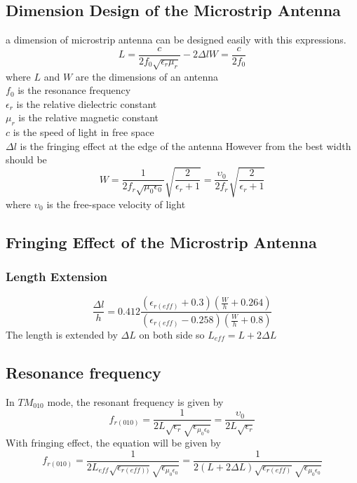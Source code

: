   \subsection{Dimension Design of the Microstrip Antenna}
    \indent a dimension of microstrip antenna can be designed easily with this expressions\cite{NoK:05}.
    \begin{equation}
      L = \frac{c}{2f_0\sqrt{\epsilon_r\mu_r}} - 2\Delta l 
      W = \frac{c}{2f_0}
    \end{equation}
    \indent where $L$ and $W$ are the dimensions of an antenna\\[1ex]
    \indent $f_0$ is the resonance frequency\\[1ex]
    \indent $\epsilon_r$ is the relative dielectric constant\\[1ex]
    \indent $\mu_r$ is the relative magnetic constant\\[1ex]
    \indent $c$ is the speed of light in free space\\[1ex]
    \indent $\Delta l$ is the fringing effect at the edge of the antenna
    \indent However from \cite{CoB:05} the best width should be
    \begin{equation}
      W = \frac {1} {2 f_r \sqrt{\mu_{0} \epsilon_{0}}}\sqrt{\frac{2}{\epsilon_{r} + 1}} = \frac{\upsilon_{0}}{2f_{r}}\sqrt{\frac{2}{\epsilon_{r} + 1}}
    \end{equation}
    \indent where $\upsilon_{0}$ is the free-space velocity of light

  \subsection{Fringing Effect of the Microstrip Antenna}
    \subsubsection {Length Extension} 
    \begin{equation}
      \frac{\Delta l}{h}=0.412\frac{(\epsilon_{r(eff)}+0.3)(\frac{W}{h} + 0.264)}{(\epsilon_{r(eff)}-0.258)(\frac{W}{h} + 0.8)}
    \end{equation}
    \indent The length is extended by $\Delta L$ on both side so $L_{eff} = L + 2\Delta L$\\

  \subsection{Resonance frequency}
    \indent In $TM_{010}$ mode, the resonant frequency is given by
    \begin{equation}  
      f_{r(010)} =  \frac{1}{2 L\sqrt{\epsilon_{r}}\sqrt{\epsilon_{\mu_{0}\epsilon_{0}}}}= \frac{\upsilon_{0}}{2L\sqrt{\epsilon_{r}}}
    \end{equation}
    \indent With fringing effect, the equation will be given by
    \begin{equation} 
      f_{r(010)} =  \frac{1}{2 L_{eff}\sqrt{\epsilon_{r(eff))}}\sqrt{\epsilon_{\mu_{0}\epsilon_{0}}}}=\frac{1}{2(L + 2\Delta L)\sqrt{\epsilon_{r(eff)}}\sqrt{\epsilon_{\mu_{0}\epsilon_{0}}}}
    \end{equation}

